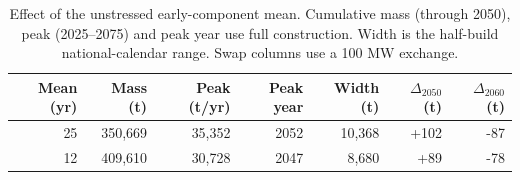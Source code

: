 \begin{table}[htbp]\centering\small
\caption{Effect of the unstressed early-component mean. Cumulative mass (through 2050), peak (2025--2075) and peak year use full construction. Width is the half-build national-calendar range. Swap columns use a 100 MW exchange.}\label{tab:early}
\begin{tabular}{rrrrrrr}\toprule
Mean (yr) & Mass (t) & Peak (t/yr) & Peak year & Width (t) & $\Delta_{2050}$ (t) & $\Delta_{2060}$ (t) \\
\midrule
25 & 350,669 & 35,352 & 2052 & 10,368 & +102 & -87 \\
12 & 409,610 & 30,728 & 2047 & 8,680 & +89 & -78 \\
\bottomrule\end{tabular}\end{table}
